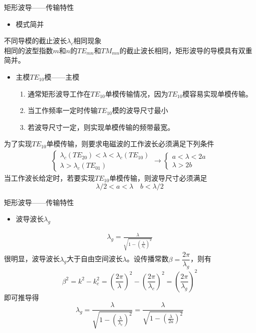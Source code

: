 \begin{frame}{矩形波导——传输特性}
    \begin{itemize}
        \item 模式简并
    \end{itemize}
    不同导模的截止波长$\lambda_c$相同现象\\
    相同的波型指数$m$和$n$的$TE_{mn}$和$TM_{mn}$的截止波长相同，矩形波导的导模具有双重简并。
    \begin{itemize}
        \item 主模$TE_{10}$模——主模
              \begin{enumerate}
                  \item 通常矩形波导工作在$TE_{10}$单模传输情况，因为$TE_{10}$模容易实现单模传输。
                  \item 当工作频率一定时传输$TE_{10}$模的波导尺寸最小
                  \item 若波导尺寸一定，则实现单模传输的频带最宽。
              \end{enumerate}
    \end{itemize}
    为了实现$TE_{10}$单模传输，则要求电磁波的工作波长必须满足下列条件
    \begin{align*}
        \begin{cases}
            \lambda_c(TE_{20})<\lambda<\lambda_c(TE_{10}) \\
            \lambda>\lambda_c(TE_{01})
        \end{cases}
        \rightarrow
        \begin{cases}
            a<\lambda<2a \\
            \lambda>2b
        \end{cases}
    \end{align*}
    当工作波长给定时，若要实现$TE_{10}$单模传输，则波导尺寸必须满足
    $$\lambda/2<a<\lambda \quad b<\lambda/2$$
\end{frame}

\begin{frame}{矩形波导——传输特性}
    \begin{itemize}
        \item 波导波长$\lambda_g$
    \end{itemize}
    \begin{align}
        \lambda_g=\frac{\lambda}{\sqrt{1-\left(\frac{\lambda}{\lambda_c}\right)^2}}
    \end{align}
    很明显，波导波长$\lambda_g$大于自由空间波长$\lambda$。设传播常数$\beta=\dfrac{2\pi}{\lambda_g}$，则有
    $$\beta^2=k^2-k_c^2=\left(\frac{2\pi}{\lambda}\right)^2-\left(\frac{2\pi}{\lambda_c}\right)^2=\left(\frac{2\pi}{\lambda_g}\right)^2$$
    即可推导得
    $$\lambda_g=\frac{\lambda}{\sqrt{1-\left(\frac{\lambda}{\lambda_c}\right)^2}}=\frac{\lambda}{\sqrt{1-\left(\frac{\lambda}{2a}\right)^2}}$$
\end{frame}

